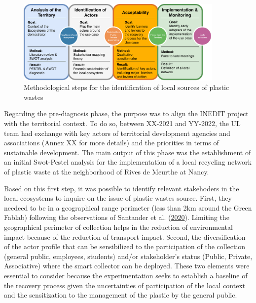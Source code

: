 \documentclass[
  11pt,
]{article}
\begin{document}
\begin{figure}[H]

{\centering \includegraphics[width=0.9\textwidth,height=\textheight]{figures/Fedoua-00.pdf}

}

\caption{\label{fig-fedoua-00}Methodological steps for the
identification of local sources of plastic wastes}

\end{figure}

Regarding the pre-diagnosis phase, the purpose was to align the INEDIT
project with the territorial context. To do so, between XX-2021 and
YY-2022, the UL team had exchange with key actors of territorial
development agencies and associations (Annex XX for more details) and
the priorities in terms of sustainable development. The main output of
this phase was the establishment of an initial Swot-Pestel analysis for
the implementation of a local recycling network of plastic waste at the
neighborhood of Rives de Meurthe at Nancy.

Based on this first step, it was possible to identify relevant
stakehoders in the local ecosystems to inquire on the issue of plastic
wastes source. First, they needeed to be in a geographical range
perimeter (less than 2km around the Green Fablab) following the
observations of Santander et al.
(\protect\hyperlink{ref-Santander2020}{2020}). Limiting the geographical
perimeter of collection helps in the reduction of environmental impact
because of the reduction of transport impact. Second, the
diversification of the actor profile that can be sensibilized to the
participation of the collection (general public, employees, students)
and/or stakeholder's status (Public, Private, Associative) where the
smart collector can be deployed. These two elements were essential to
consider because the experimentation seeks to establish a baseline of
the recovery process given the uncertainties of participation of the
local context and the sensitization to the management of the plastic by
the general public.
\end{document}
